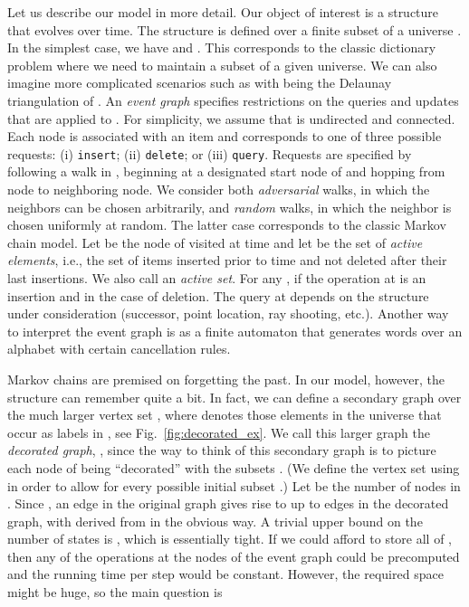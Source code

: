 \documentclass[oribibl,envcountsect,envcountsame]{llncs}
\begin{document}
Let us describe our model in more detail.
Our object of interest is a structure  that evolves
over time. The structure  is defined over a
finite subset  of a universe .
In the simplest case, we have   and 
. This corresponds to the classic
dictionary problem where we need to maintain a subset of a 
given universe. We can also imagine more complicated 
scenarios such as  with 
 being the Delaunay triangulation of .
An \emph{event graph}  specifies restrictions
on the queries and updates that are applied to .
For simplicity, we assume that  is undirected and connected.
Each node  is associated with an item 
and corresponds to one of three possible requests:
(i) \texttt{insert};
(ii) \texttt{delete}; or
(iii) \texttt{query}.
Requests are specified by following a walk in ,
beginning at a designated start node of  and hopping
from node to neighboring node. We consider both \emph{adversarial}
walks, in which the neighbors can be chosen arbitrarily, and
\emph{random} walks, in which the neighbor is chosen uniformly at random.
The latter case corresponds to the classic Markov chain model. 
Let  be the node of  visited at time  and 
let  be the set of \emph{active elements},
i.e., the set of items inserted prior to time  
and not deleted after their last insertions.
We also call  an \emph{active set}.
For any , 
if the operation at  is an insertion and
 in the case of deletion.
The query at  depends on the structure under consideration
(successor, point location, ray shooting, etc.).
Another way to interpret the event graph is as a 
finite automaton that generates words over an alphabet with 
certain cancellation rules.

Markov chains are premised on forgetting the past.
In our model, however, the structure
 can remember quite a bit. In fact, we can
define a secondary graph over the much larger
vertex set , 
where  denotes those 
elements in the universe that occur as labels in , see Fig.~\ref{fig:decorated_ex}. 
We call this larger graph the \emph{decorated graph},
, since the way to think of this
secondary graph is to picture each node  of  being
``decorated'' with the subsets . 
(We define the vertex set using 
in order to allow for every possible initial subset .)
Let 
be the number of nodes in . Since , an edge 
in the original graph gives rise to up to  edges 
 in the decorated graph, 
with  derived from  in the obvious way.
A trivial upper bound on the number of states is , which is
essentially tight.
If we could afford to store all of ,
then any of the operations at the nodes of the
event graph could be precomputed and the running time per step would be constant.
However, the required space might be huge,
so the main question is 
\end{document}
